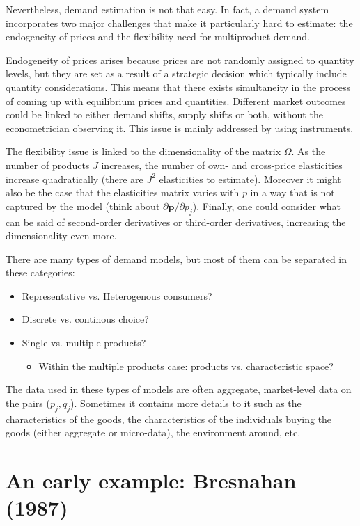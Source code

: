 \documentclass[12pt]{report}
\begin{document}
Nevertheless, demand estimation is not that easy. In fact, a demand system incorporates two major challenges that make it particularly hard to estimate: the endogeneity of prices and the flexibility need for multiproduct demand.

Endogeneity of prices arises because prices are not randomly assigned to quantity levels, but they are set as a result of a strategic decision which typically include quantity considerations. This means that there exists simultaneity in the process of coming up with equilibrium prices and quantities. Different market outcomes could be linked to either demand shifts, supply shifts or both, without the econometrician observing it. This issue is mainly addressed by using instruments.

The flexibility issue is linked to the dimensionality of the matrix $\Omega$. As the number of products $J$ increases, the number of own- and cross-price elasticities increase quadratically (there are $J^2$ elasticities to estimate). Moreover it might also be the case that the elasticities matrix varies with $p$ in a way that is not captured by the model (think about $\partial \mathbf{p}/\partial p_j$). Finally, one could consider what can be said of second-order derivatives or third-order derivatives, increasing the dimensionality even more.

There are many types of demand models, but most of them can be separated in these categories:\begin{itemize}
\item Representative vs. Heterogenous consumers?
\item Discrete vs. continous choice?
\item Single vs. multiple products?
\begin{itemize}
\item Within the multiple products case: products vs. characteristic space?
\end{itemize}
\end{itemize}

The data used in these types of models are often aggregate, market-level data on the pairs ($p_j, q_j$). Sometimes it contains more details to it such as the characteristics of the goods, the characteristics of the individuals buying the goods (either aggregate or micro-data), the environment around, etc.

\section{An early example: Bresnahan (1987)}
\end{document}

